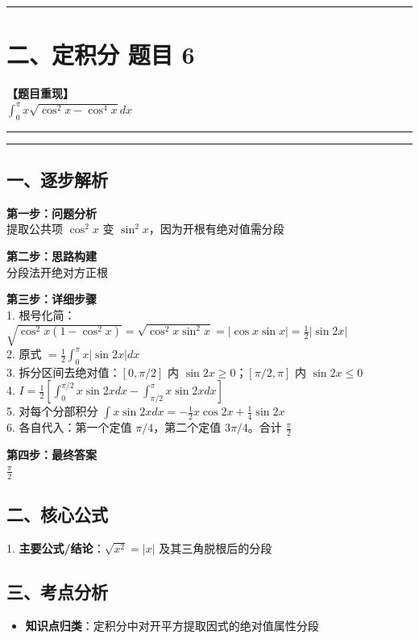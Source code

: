 ﻿\documentclass[12pt, a4paper]{ctexart}
\newcommand{\TopSeparator}{
    \par\noindent\rule{\textwidth}{1.5pt}\vspace{0.5em}
}
\newcommand{\AnalysisSeparator}{
    \par\noindent\rule{\textwidth}{0.5pt}\vspace{0.2em}\hrule\vspace{0.5em}
}
\newenvironment{RedAnalysis}{
    \par
    \color{red} 
}{
    \par
    \color{black} 
}
\begin{document}
\vspace{2em}

\TopSeparator
\section*{二、定积分 题目 6}

\textbf{【题目重现】} \\
$\int_{0}^{\pi} x \sqrt{\cos^2 x - \cos^4 x} dx$

\AnalysisSeparator

\begin{RedAnalysis}

	\subsection*{一、逐步解析}

	\textbf{第一步：问题分析} \\
	提取公共项 $\cos^2 x$ 变 $\sin^2 x$，因为开根有绝对值需分段

	\textbf{第二步：思路构建} \\
	分段法开绝对方正根

	\textbf{第三步：详细步骤} \\
	1. 根号化简：$\sqrt{\cos^2 x (1-\cos^2 x)} = \sqrt{\cos^2 x \sin^2 x} = |\cos x \sin x| = \frac{1}{2}|\sin 2x|$ \\ 
	2. 原式 $= \frac{1}{2} \int_0^\pi x |\sin 2x| dx$ \\ 
	3. 拆分区间去绝对值：$[0, \pi/2]$ 内 $\sin 2x \ge 0$；$[\pi/2, \pi]$ 内 $\sin 2x \le 0$ \\ 
	4. $I = \frac{1}{2} [\int_0^{\pi/2} x\sin 2x dx - \int_{\pi/2}^\pi x\sin 2x dx]$ \\ 
	5. 对每个分部积分 $\int x\sin 2x dx = -\frac{1}{2}x\cos 2x + \frac{1}{4}\sin 2x$ \\ 
	6. 各自代入：第一个定值 $\pi/4$，第二个定值 $3\pi/4$。合计 $\frac{\pi}{2}$

	\textbf{第四步：最终答案} \\
	$\frac{\pi}{2}$

	\subsection*{二、核心公式}
	1. \textbf{主要公式/结论}：$\sqrt{x^2} = |x| \text{ 及其三角脱根后的分段}$

	\subsection*{三、考点分析}
	\begin{itemize}
		\item \textbf{知识点归类}：定积分中对开平方提取因式的绝对值属性分段
	\end{itemize}

\end{RedAnalysis}
\end{document}
